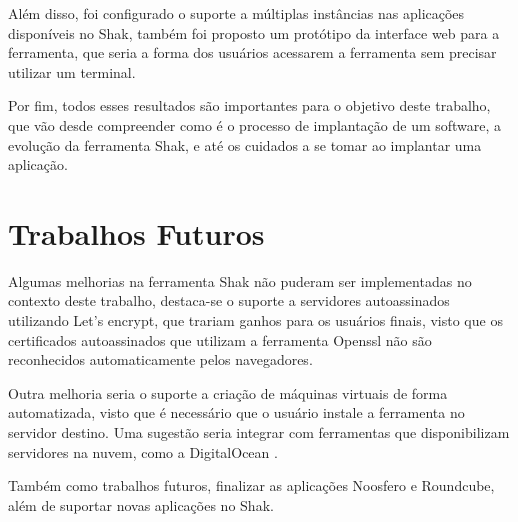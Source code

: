 Além disso, foi configurado o suporte a múltiplas instâncias nas aplicações disponíveis
no Shak, também foi proposto um protótipo
da interface web para a ferramenta, que seria a forma dos usuários acessarem a
ferramenta sem precisar utilizar um terminal.

Por fim, todos esses resultados são importantes para o objetivo deste trabalho, que vão
desde compreender como é o processo de implantação de um software, a evolução
da ferramenta Shak, e até os cuidados
a se tomar ao implantar uma aplicação.
 
\section{Trabalhos Futuros}
%
Algumas melhorias na ferramenta Shak não puderam ser implementadas no contexto
deste trabalho, destaca-se o suporte a servidores autoassinados utilizando
Let's encrypt, que trariam ganhos para os usuários finais, visto que os certificados
autoassinados que utilizam a ferramenta Openssl não são reconhecidos automaticamente
pelos navegadores. 

Outra melhoria seria o suporte a criação de máquinas virtuais de forma automatizada, visto
que é necessário que o usuário instale a ferramenta no servidor destino. Uma sugestão
seria integrar com ferramentas que disponibilizam servidores na nuvem, como
a DigitalOcean . 
 
Também como trabalhos futuros, finalizar as aplicações Noosfero e Roundcube, além
de suportar novas aplicações no Shak.
